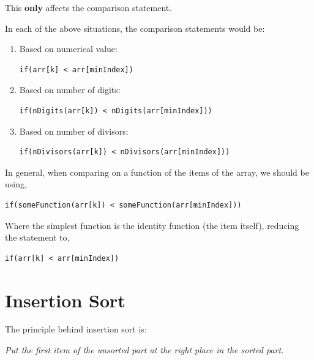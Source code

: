 This \textbf{only} affects the comparison statement.

In each of the above situations, the comparison statements would be:

\begin{enumerate}
\item Based on numerical value: 
\begin{lstlisting}
if(arr[k] < arr[minIndex])
\end{lstlisting}
\item Based on number of digits: 
\begin{lstlisting}
if(nDigits(arr[k]) < nDigits(arr[minIndex]))
\end{lstlisting}
\item Based on number of divisors:
\begin{lstlisting}
if(nDivisors(arr[k]) < nDivisors(arr[minIndex]))
\end{lstlisting}
\end{enumerate}

In general, when comparing on a function of the items of the array, we should be using,

\begin{lstlisting}
if(someFunction(arr[k]) < someFunction(arr[minIndex]))
\end{lstlisting}

Where the simplest function is the identity function (the item itself), reducing the statement to,

\begin{lstlisting}
if(arr[k] < arr[minIndex])
\end{lstlisting}

\section{Insertion Sort}

The principle behind insertion sort is:

\begin{center}
	\emph{
		Put the first item of the unsorted part at the right place in the sorted part.
	}
\end{center}

